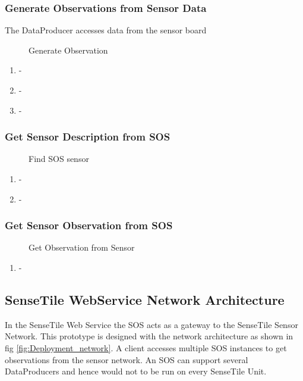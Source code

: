 \documentclass[]{final_report}
\begin{document}
\subsubsection{Generate Observations from Sensor Data}
The DataProducer accesses data from the sensor board 
\begin{figure}[h]
\centering
{}
\caption{Generate Observation}\label{fig:InsertObs}
\end{figure}
 \begin{enumerate}
\item -
\item -
\item -
\end{enumerate}

\subsubsection{Get Sensor Description from SOS}
\begin{figure}[h]
\centering
{}
\caption{Find SOS sensor}\label{fig:GetMeta}
\end{figure}
 \begin{enumerate}
\item -
\item -
\end{enumerate}
\subsubsection{Get  Sensor Observation from SOS}
\begin{figure}[h]
\centering
{}
\caption{Get Observation from Sensor}\label{fig:GetObs}
\end{figure}
 \begin{enumerate}
\item -
\end{enumerate}

\subsection{SenseTile WebService Network Architecture}
\label{subsec:SenseTile WebService Network Architecture}
In the SenseTile Web Service the SOS acts as a gateway to the SenseTile Sensor Network. This prototype is designed with the network architecture as shown in fig \ref{fig:Deployment_network}. A client accesses multiple SOS instances to get observations from the sensor network. An SOS can support several DataProducers and hence would not to be run on every SenseTile Unit. 
\end{document}
